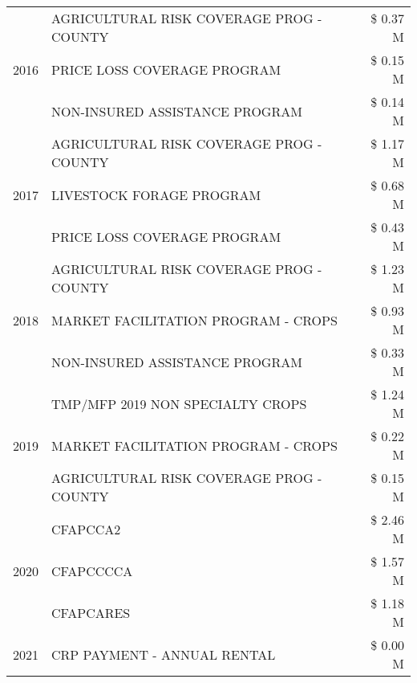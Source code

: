\begin{tabular}{llr}
\cline{1-3}
\multirow[t]{3}{*}{2016} & AGRICULTURAL RISK COVERAGE PROG - COUNTY & \$ 0.37 M \\
 & PRICE LOSS COVERAGE PROGRAM & \$ 0.15 M \\
 & NON-INSURED ASSISTANCE PROGRAM & \$ 0.14 M \\
\cline{1-3}
\multirow[t]{3}{*}{2017} & AGRICULTURAL RISK COVERAGE PROG - COUNTY & \$ 1.17 M \\
 & LIVESTOCK FORAGE PROGRAM & \$ 0.68 M \\
 & PRICE LOSS COVERAGE PROGRAM & \$ 0.43 M \\
\cline{1-3}
\multirow[t]{3}{*}{2018} & AGRICULTURAL RISK COVERAGE PROG - COUNTY & \$ 1.23 M \\
 & MARKET FACILITATION PROGRAM - CROPS & \$ 0.93 M \\
 & NON-INSURED ASSISTANCE PROGRAM & \$ 0.33 M \\
\cline{1-3}
\multirow[t]{3}{*}{2019} & TMP/MFP 2019 NON SPECIALTY CROPS & \$ 1.24 M \\
 & MARKET FACILITATION PROGRAM - CROPS & \$ 0.22 M \\
 & AGRICULTURAL RISK COVERAGE PROG - COUNTY & \$ 0.15 M \\
\cline{1-3}
\multirow[t]{3}{*}{2020} & CFAPCCA2 & \$ 2.46 M \\
 & CFAPCCCCA & \$ 1.57 M \\
 & CFAPCARES & \$ 1.18 M \\
\cline{1-3}
2021 & CRP PAYMENT - ANNUAL RENTAL & \$ 0.00 M \\
\cline{1-3}
\bottomrule
\end{tabular}
